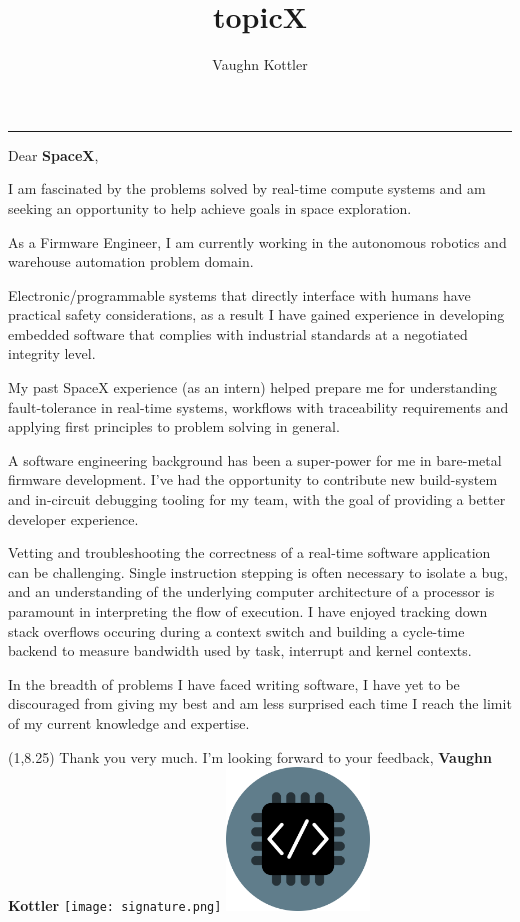 \documentclass[letterpaper,12pt]{article}
\title{topicX}
\author{Vaughn Kottler}
\begin{document}
{\centering\noindent\rule{7.75in}{0.5pt}}\break\break
Dear {\color{pri-600}\textbf{SpaceX}},

\noindent\break
I am fascinated by the problems solved by real-time compute systems and am
seeking an opportunity to help achieve goals in space exploration.

\noindent\break
As a Firmware Engineer, I am currently working in the autonomous robotics and
warehouse automation problem domain.

\noindent\break
Electronic/programmable systems that directly interface with humans have
practical safety considerations, as a result I have gained experience in
developing embedded software that complies with industrial standards at
a negotiated integrity level.

\noindent\break
My past SpaceX experience (as an intern) helped prepare me for understanding
fault-tolerance in real-time systems, workflows with traceability requirements
and applying first principles to problem solving in general.

\noindent\break
A software engineering background has been a super-power for me in bare-metal
firmware development. I've had the opportunity to contribute new build-system
and in-circuit debugging tooling for my team, with the goal of providing
a better developer experience.

\noindent\break
Vetting and troubleshooting the correctness of a real-time software
application can be challenging. Single instruction stepping is often necessary
to isolate a bug, and an understanding of the underlying computer architecture
of a processor is paramount in interpreting the flow of execution. I have
enjoyed tracking down stack overflows occuring during a context switch and
building a cycle-time backend to measure bandwidth used by task, interrupt and
kernel contexts.

\noindent\break
In the breadth of problems I have faced writing software, I have yet to be
discouraged from giving my best and am less surprised each time I reach
the limit of my current knowledge and expertise.

{\begin{textblock}{8}(1,8.25)\noindent
Thank you very much. I'm looking forward to your feedback,\break\break
{\color{pri-600}\textbf{Vaughn Kottler}}\break\break
\texttt{[image: signature.png]}
\hspace{1.75in}
\includegraphics[width=1.5in,natwidth=100,natheight=100]{../im/logo_circular_510.png}
\end{textblock}}
\end{document}
